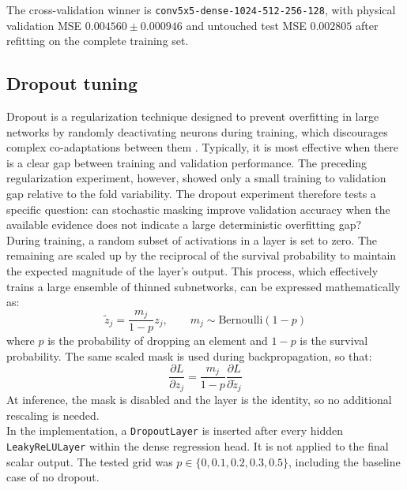The cross-validation winner is \texttt{conv5x5-dense-1024-512-256-128}, with physical validation MSE $0.004560\pm0.000946$ and untouched test MSE $0.002805$ after refitting on the complete training set. 

\subsection{Dropout tuning}
\label{sec:04_dropout_tuning}

Dropout is a regularization technique designed to prevent overfitting in large networks by randomly deactivating neurons during training, which discourages complex co-adaptations between them \cite{srivastava2014dropout}. Typically, it is most effective when there is a clear gap between training and validation performance. The preceding regularization experiment, however, showed only a small training to validation gap relative to the fold variability. The dropout experiment therefore tests a specific question: can stochastic masking improve validation accuracy when the available evidence does not indicate a large deterministic overfitting gap?\\

During training, a random subset of activations in a layer is set to zero. The remaining are scaled up by the reciprocal of the survival probability to maintain the expected magnitude of the layer's output. This process, which effectively trains a large ensemble of thinned subnetworks, can be expressed mathematically as:
\begin{equation}
    \widetilde{z}_j = \frac{m_j}{1-p}z_j,
    \qquad m_j\sim\mathrm{Bernoulli}(1-p)
    \label{eq:04_dropout}
\end{equation}
where $p$ is the probability of dropping an element and $1-p$ is the survival probability. The same scaled mask is used during backpropagation, so that:
\begin{equation}
    \frac{\partial L}{\partial z_j} =
    \frac{m_j}{1-p}\frac{\partial L}{\partial\widetilde{z}_j}
    \label{eq:04_dropout_backward}
\end{equation}
At inference, the mask is disabled and the layer is the identity, so no additional rescaling is needed.\\     

In the implementation, a \texttt{DropoutLayer} is inserted after every hidden \texttt{LeakyReLULayer} within the dense regression head. It is not applied to the final scalar output. The tested grid was $p\in\{0,0.1,0.2,0.3,0.5\}$, including the baseline case of no dropout.\\

